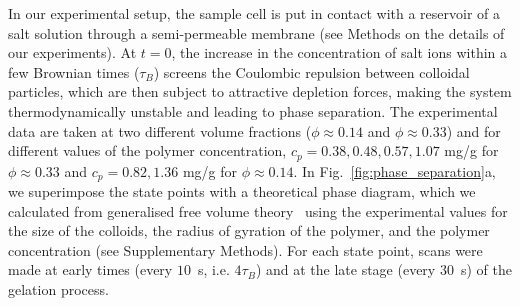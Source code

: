 \documentclass[preprint,amsmath,amssymb,superscriptaddress]{revtex4-1}
\begin{document}
In our experimental setup, the sample cell is put in contact with a reservoir of a salt solution through a semi-permeable membrane (see Methods 
on the details of our experiments).
At $t=0$, the increase in the concentration of salt ions within a few Brownian times ($\tau_B$) screens the Coulombic repulsion between colloidal particles,
which are then subject to attractive depletion forces, making the system thermodynamically unstable and leading to phase separation. 
The experimental data are taken at two different volume fractions ($\phi\approx 0.14$ and $\phi\approx 0.33$) and for different values
of the polymer concentration, $c_p=0.38,0.48,0.57,1.07$ mg/g for $\phi\approx 0.33$ and $c_p=0.82,1.36$ mg/g for $\phi\approx 0.14$.
In Fig.~\ref{fig:phase_separation}a, we superimpose the state points with a theoretical phase diagram, which we calculated from generalised free volume theory~\cite{Fleer2008} using the experimental values for the size of the colloids, the radius of gyration of the polymer, and the polymer concentration (see Supplementary Methods).
For each state point, scans were made at early times (every $10$~s, i.e. $4\tau_B$) and at the late stage (every $30$~s) of the gelation process. 
\end{document}
